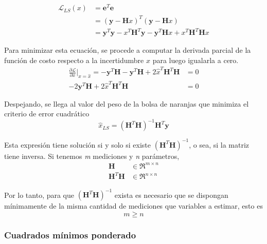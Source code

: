 \begin{align}
    \mathscr{L}_{LS}(x) &= \bm{e}^T\bm{e} \\
                        &= (\bm{y} - \bm{H}x)^T(\bm{y} - \bm{H}x) \\
                        &= \bm{y}^T\bm{y} - x^T\bm{H}^T\bm{y} - \bm{y}^T\bm{H}x + x^T\bm{H}^T\bm{H}x
\end{align}

Para minimizar esta ecuación, se procede a computar la derivada parcial de la función de costo respecto a la incertidumbre $x$ para luego igualarla a cero.
\begin{align}
    \frac{\partial \mathscr{L}}{\partial x}\bigg\rvert_{x=\hat{x}} = -\bm{y}^T\bm{H} - \bm{y}^T\bm{H} + 2\hat{x}^T\bm{H}^T\bm{H} &= 0 \\
    -2\bm{y}^T\bm{H} + 2\hat{x}^T\bm{H}^T\bm{H} &= 0
\end{align}

Despejando, se llega al valor del peso de la bolsa de naranjas que minimiza el criterio de error cuadrático
\begin{equation}
    \hat{x}_{LS} = (\bm{H}^T\bm{H})^{-1}\bm{H}^T\bm{y}
\end{equation}

Esta expresión tiene solución si y solo si existe $(\bm{H}^T\bm{H})^{-1}$, o sea, si la matriz tiene inversa. Si tenemos \textit{m} mediciones y \textit{n} parámetros,
\begin{align*}
    \bm{H} &\in \Re^{m\times n} \\
    \bm{H}^T\bm{H} &\in \Re^{n\times n}
\end{align*}

Por lo tanto, para que $(\bm{H}^T\bm{H})^{-1}$ exista es necesario que se dispongan mínimamente de la misma cantidad de mediciones que variables a estimar, esto es
\begin{equation*}
    m \geq n
\end{equation*}

\subsubsection{Cuadrados mínimos ponderado}

